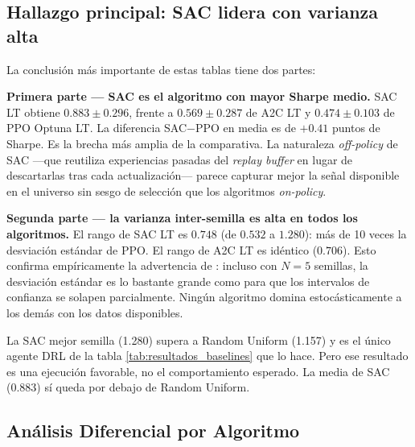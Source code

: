 \documentclass[IB,a4paper]{TFUOC}
\begin{document}
\subsection{Hallazgo principal: SAC lidera con varianza alta}

La conclusión más importante de estas tablas tiene dos partes:

\textbf{Primera parte — SAC es el algoritmo con mayor Sharpe medio.} SAC LT obtiene $0.883 \pm 0.296$, frente a $0.569 \pm 0.287$ de A2C LT y $0.474 \pm 0.103$ de PPO Optuna LT. La diferencia SAC$-$PPO en media es de $+0.41$ puntos de Sharpe. Es la brecha más amplia de la comparativa. La naturaleza \textit{off-policy} de SAC —que reutiliza experiencias pasadas del \textit{replay buffer} en lugar de descartarlas tras cada actualización— parece capturar mejor la señal disponible en el universo sin sesgo de selección que los algoritmos \textit{on-policy}.

\textbf{Segunda parte — la varianza inter-semilla es alta en todos los algoritmos.} El rango de SAC LT es $0.748$ (de $0.532$ a $1.280$): más de 10 veces la desviación estándar de PPO. El rango de A2C LT es idéntico ($0.706$). Esto confirma empíricamente la advertencia de \citet{henderson2018deeprl}: incluso con $N=5$ semillas, la desviación estándar es lo bastante grande como para que los intervalos de confianza se solapen parcialmente. Ningún algoritmo domina estocásticamente a los demás con los datos disponibles.

La SAC mejor semilla (1.280) supera a Random Uniform (1.157) y es el único agente DRL de la tabla \ref{tab:resultados_baselines} que lo hace. Pero ese resultado es una ejecución favorable, no el comportamiento esperado. La media de SAC (0.883) sí queda por debajo de Random Uniform.

\subsection{Análisis Diferencial por Algoritmo}
\end{document}
